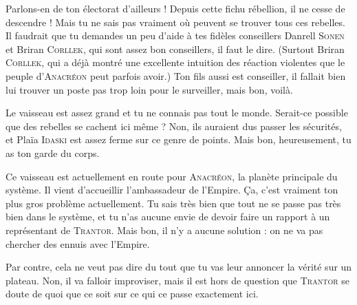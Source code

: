 \documentclass{article}
\begin{document}
{{Parlons-en de ton électorat d’ailleurs !
Depuis cette fichu rébellion, il ne cesse de descendre !
Mais tu ne sais pas vraiment où peuvent se trouver tous ces rebelles.
Il faudrait que tu demandes un peu d’aide à tes fidèles conseillers Danrell \textsc{Sonen} et Briran \textsc{Corllek}, qui sont assez bon conseillers, il faut le dire.
(Surtout Briran \textsc{Corllek}, qui a déjà montré une excellente intuition des réaction violentes que le peuple d’\textsc{Anacréon} peut parfois avoir.)
Ton fils aussi est conseiller, il fallait bien lui trouver un poste pas trop loin pour le surveiller, mais bon, voilà.

Le vaisseau est assez grand et tu ne connais pas tout le monde.
Serait-ce possible que des rebelles se cachent ici même ?
Non, ils auraient dus passer les sécurités, et Plaïa \textsc{Idaski} est assez ferme sur ce genre de points.
Mais bon, heureusement, tu as ton garde du corps.

Ce vaisseau est actuellement en route pour \textsc{Anacréon}, la planète principale du système.
Il vient d’accueillir l’ambassadeur de l’Empire.
Ça, c’est vraiment ton plus gros problème actuellement.
Tu sais très bien que tout ne se passe pas très bien dans le système, et tu n’as aucune envie de devoir faire un rapport à un représentant de \textsc{Trantor}.
Mais bon, il n’y a aucune solution : on ne va pas chercher des ennuis avec l’Empire.

Par contre, cela ne veut pas dire du tout que tu vas leur annoncer la vérité sur un plateau.
Non, il va falloir improviser, mais il est hors de question que \textsc{Trantor} se doute de quoi que ce soit sur ce qui ce passe exactement ici.
}
}
\end{document}
